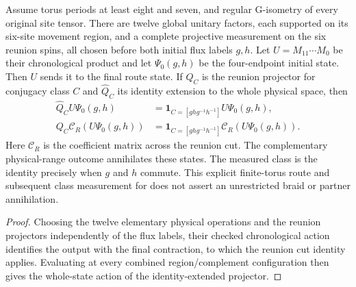 \begin{lemma}%
    \label{thm:peps_torus_swept_physical_route_measurement}
    \leanok
    Assume torus periods at least eight and seven, and regular
    G-isometry of every original site tensor. There are twelve global
    unitary factors, each supported on its six-site movement
    region, and a complete projective measurement on the six reunion
    spins, all chosen before both initial flux labels $g,h$.
    Let $U=M_{11}\cdots M_0$ be their chronological product and let
    $\Psi_0(g,h)$ be the four-endpoint initial state. Then $U$
    sends it to the final route state. If $Q_C$ is the reunion
    projector for conjugacy class $C$ and $\widehat Q_C$ its identity
    extension to the whole physical space, then
    \begin{align}
        \widehat Q_C U\Psi_0(g,h)
         & =\mathbf1_{C=[ghg^{-1}h^{-1}]}U\Psi_0(g,h),               \\
        Q_C\mathcal C_R(U\Psi_0(g,h))
         & =\mathbf1_{C=[ghg^{-1}h^{-1}]}\mathcal C_R(U\Psi_0(g,h)).
    \end{align}
    Here $\mathcal C_R$ is the coefficient matrix across the
    reunion cut. The complementary physical-range outcome annihilates
    these states. The measured class is the identity precisely when
    $g$ and $h$ commute.
    This explicit finite-torus route and subsequent class
    measurement for \cite[\S6.6, local lines 2340--2423]{Schuch2010PEPS}
    does not assert an unrestricted braid or partner annihilation.
\end{lemma}

\begin{proof}\leanok
    Choosing the twelve elementary physical operations and the reunion
    projectors independently of the flux labels, their checked
    chronological action identifies the output with the final
    contraction, to which the reunion cut identity applies.
    Evaluating at every combined region/complement configuration then
    gives the whole-state action of the identity-extended projector.
\end{proof}
